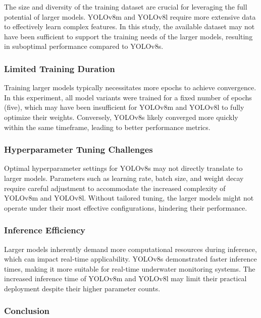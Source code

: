 \documentclass[conference]{IEEEtran}
\begin{document}
The size and diversity of the training dataset are crucial for leveraging the full potential of larger models. YOLOv8m and YOLOv8l require more extensive data to effectively learn complex features. In this study, the available dataset may not have been sufficient to support the training needs of the larger models, resulting in suboptimal performance compared to YOLOv8s.

\subsubsection{Limited Training Duration}

Training larger models typically necessitates more epochs to achieve convergence. In this experiment, all model variants were trained for a fixed number of epochs (five), which may have been insufficient for YOLOv8m and YOLOv8l to fully optimize their weights. Conversely, YOLOv8s likely converged more quickly within the same timeframe, leading to better performance metrics.

\subsubsection{Hyperparameter Tuning Challenges}

Optimal hyperparameter settings for YOLOv8s may not directly translate to larger models. Parameters such as learning rate, batch size, and weight decay require careful adjustment to accommodate the increased complexity of YOLOv8m and YOLOv8l. Without tailored tuning, the larger models might not operate under their most effective configurations, hindering their performance.

\subsubsection{Inference Efficiency}

Larger models inherently demand more computational resources during inference, which can impact real-time applicability. YOLOv8s demonstrated faster inference times, making it more suitable for real-time underwater monitoring systems. The increased inference time of YOLOv8m and YOLOv8l may limit their practical deployment despite their higher parameter counts.

\subsubsection{Conclusion}
\end{document}
